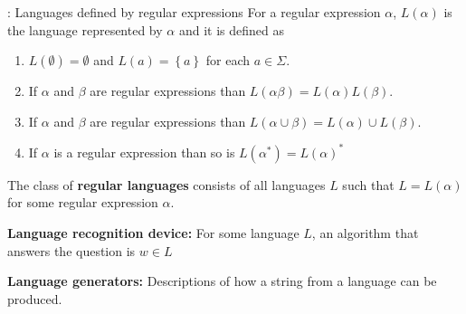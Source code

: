 \begin{multicols}{2}
\begin{definition}{: Languages defined by regular expressions}
  For a regular expression $\alpha$, $L(\alpha)$ is the language represented by $\alpha$ and it is defined as
  \begin{enumerate}
    \item $L(\emptyset) = \emptyset$ and $L(a) = \left\{ a \right\}$ for each $a \in \Sigma$.
    \item If $\alpha$ and $\beta$ are regular expressions than $L(\alpha\beta) = L(\alpha)L(\beta)$.
    \item If $\alpha$ and $\beta$ are regular expressions than $L(\alpha \cup \beta) = L(\alpha) \cup L(\beta)$.
    \item If $\alpha$ is a regular expression than so is $L(\alpha^*) = L(\alpha)^*$
  \end{enumerate}
\end{definition}

The class of \textbf{regular languages} consists of all languages $L$ such that $L = L(\alpha)$ for some regular expression $\alpha$.

\noindent \textbf{Language recognition device:} For some language $L$, an algorithm that answers the question is $w \in L$

\noindent \textbf{Language generators:} Descriptions of how a string from a language can be produced.

\end{multicols}
